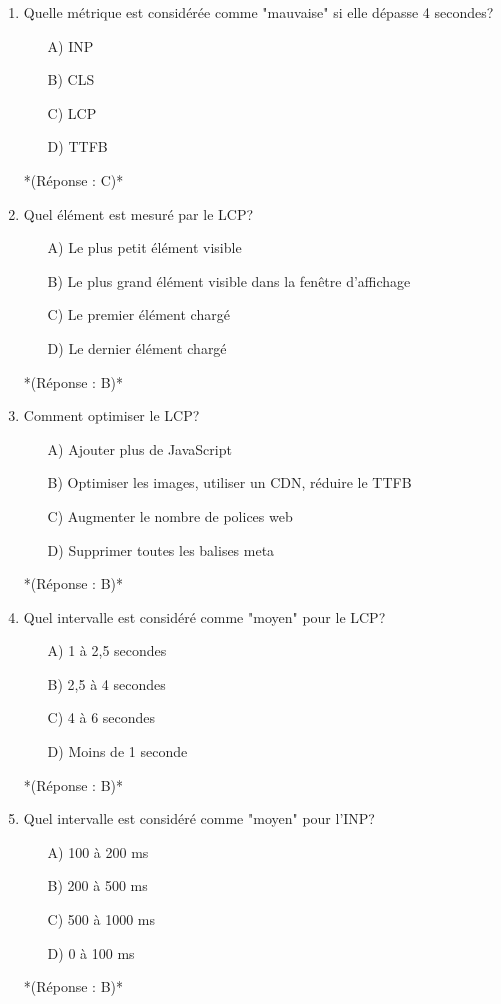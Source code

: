 \documentclass[12pt,a4paper,twoside]{report}
\begin{document}
\begin{enumerate}
\item Quelle métrique est considérée comme "mauvaise" si elle dépasse 4 secondes?
\begin{itemize}
\item[A)] INP
\item[B)] CLS
\item[C)] LCP
\item[D)] TTFB
\end{itemize}
*(Réponse : C)*

\item Quel élément est mesuré par le LCP?
\begin{itemize}
\item[A)] Le plus petit élément visible
\item[B)] Le plus grand élément visible dans la fenêtre d'affichage
\item[C)] Le premier élément chargé
\item[D)] Le dernier élément chargé
\end{itemize}
*(Réponse : B)*

\item Comment optimiser le LCP?
\begin{itemize}
\item[A)] Ajouter plus de JavaScript
\item[B)] Optimiser les images, utiliser un CDN, réduire le TTFB
\item[C)] Augmenter le nombre de polices web
\item[D)] Supprimer toutes les balises meta
\end{itemize}
*(Réponse : B)*

\item Quel intervalle est considéré comme "moyen" pour le LCP?
\begin{itemize}
\item[A)] 1 à 2,5 secondes
\item[B)] 2,5 à 4 secondes
\item[C)] 4 à 6 secondes
\item[D)] Moins de 1 seconde
\end{itemize}
*(Réponse : B)*

\item Quel intervalle est considéré comme "moyen" pour l'INP?
\begin{itemize}
\item[A)] 100 à 200 ms
\item[B)] 200 à 500 ms
\item[C)] 500 à 1000 ms
\item[D)] 0 à 100 ms
\end{itemize}
*(Réponse : B)*


\end{enumerate}
\end{document}
